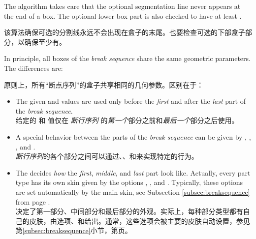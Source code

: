 The algorithm takes care that the optional segmentation line never appears at
the end of a box. The optional lower box part is also checked to
have at least .

该算法确保可选的分割线永远不会出现在盒子的末尾。也要检查可选的下部盒子部分，以确保至少有。

In principle, all boxes of the \emph{break sequence} share the same geometric
parameters. The differences are:

原则上，所有“断点序列”的盒子共享相同的几何参数。区别在于：
\begin{itemize}
\item The given  and  values are
  used only before the \emph{first} and after the \emph{last} part
  of the \emph{break sequence}.
\\给定的  和  值仅在 \emph{断行序列} 的\emph{第一个}部分之前和\emph{最后一个}部分之后使用。
\item A special behavior between the parts of the \emph{break sequence} can
  be given by ,
  ,
  , and
  .
\\\emph{断行序列}的各个部分之间可以通过、、和来实现特定的行为。
\item The  decides \emph{how} the \emph{first}, \emph{middle},
  and \emph{last} part look like. Actually, every part type has its own
  skin given by the options  , , and
  . Typically, these options are set automatically by
  the main skin, see Subsection \ref{subsec:breaksequence} from
  page \pageref{subsec:breaksequence}.
\\决定了第一部分、中间部分和最后部分的外观。实际上，每种部分类型都有自己的皮肤，由选项、和给出。通常，这些选项会被主要的皮肤自动设置，参见第\ref{subsec:breaksequence}小节，第\pageref{subsec:breaksequence}页。
\end{itemize}